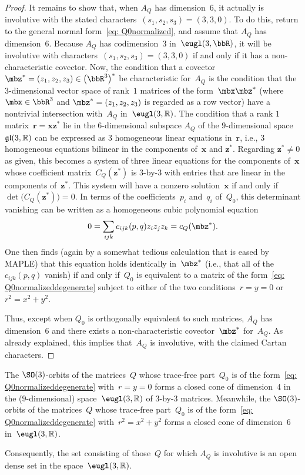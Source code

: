 \begin{proof}
It remains to show that, when $A_Q$ has dimension~$6$,
it actually is involutive with the stated characters~$(s_1,s_2,s_3)=(3,3,0)$.
To do this, return to the general normal form~\eqref{eq: Q0normalized},
and assume that $A_Q$ has dimension~$6$.
Because $A_Q$ has codimension~$3$ in~$\eugl(3,\bbR)$,
it will be involutive with characters~$(s_1,s_2,s_3)=(3,3,0)$
if and only if it has a non-characteristic covector.
Now, the condition that a covector~$\mbz^* = (z_1,z_2,z_3)\in \big(\bbR^3\big)^*$
be characteristic for~$A_Q$ is the condition
that the $3$-dimensional vector space of rank~$1$ matrices
of the form~$\mbx \mbz^*$ (where $\mbx\in\bbR^3$ and $\mbz^* = (z_1,z_2,z_3)$
is regarded as a row vector) have a nontrivial intersection
with~$A_Q$ in~$\eugl(3,\mathbb{R})$.
The condition that a rank $1$ matrix~$\mathbf{r} = \mathbf{x}\mathbf{z}^*$
lie in the $6$-dimensional subspace $A_Q$ of the $9$-dimensional space
$\frak{gl}(3,\mathbb{R})$ can be expressed as 3 homogeneous linear equations in~$\mathbf{r}$,
i.e., $3$ homogeneous equations bilinear in the components
of~$\mathbf{x}$ and $\mathbf{z}^*$. Regarding $\mathbf{z}^*\not=0$ as given,
this becomes a system of three linear equations for the components
of~$\mathbf{x}$ whose coefficient matrix~$C_Q(\mathbf{z}^*)$ is $3$-by-$3$
with entries that are linear in the components of~$\mathbf{z}^*$.
This system will have a nonzero solution~$\mathbf{x}$
if and only if $\det\bigl(C_Q(\mathbf{z}^*)\bigr) = 0$.
In terms of the coefficients~$p_i$ and~$q_i$ of~$Q_0$,
this determinant vanishing can be written
as a homogeneous cubic polynomial equation
\begin{gather*}%
0 = \sum_{ijk} c_{ijk}(p,q) z_i z_j z_k = c_Q(\mbz^*).
\end{gather*}
One then finds (again by a somewhat tedious calculation
that is eased by MAPLE) that this equation holds identically in~$\mbz^*$
(i.e., that all of the~$c_{ijk}(p,q)$ vanish) if and only if~$Q_0$
is equivalent to a matrix of the form~\eqref{eq: Q0normalizeddegenerate}
subject to either of the two conditions~$r=y=0$ or $r^2 = x^2+y^2$.

Thus, except when $Q_0$ is orthogonally equivalent to such matrices,
$A_Q$ has dimension~$6$ and there exists a non-characteristic covector~$\mbz^*$ for~$A_Q$. As already explained, this implies that~$A_Q$ is
involutive, with the claimed Cartan characters.
\end{proof}

\begin{Remark}The $\SO(3)$-orbits of the matrices~$Q$
whose trace-free part~$Q_0$
is of the form~\eqref{eq: Q0normalizeddegenerate}
with~$r=y=0$ forms a closed cone of dimension~$4$
in the ($9$-dimensional) space~$\eugl(3,\mathbb{R})$
of $3$-by-$3$ matrices.
Meanwhile, the $\SO(3)$-orbits of the matrices~$Q$
whose trace-free part~$Q_0$
is of the form~\eqref{eq: Q0normalizeddegenerate}
with~$r^2=x^2+y^2$ forms a closed cone of dimension~$6$
in~$\eugl(3,\mathbb{R})$.

Consequently, the set consisting of those~$Q$
for which $A_Q$ is involutive is an open dense set
in the space~$\eugl(3,\mathbb{R})$.
\end{Remark}

